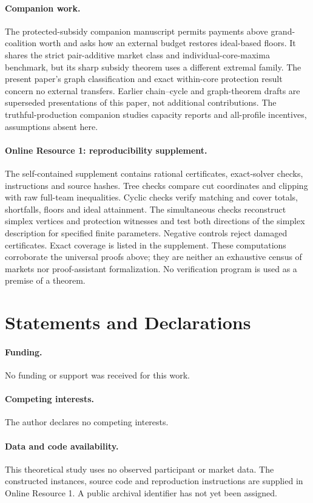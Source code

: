 \documentclass[11pt]{article}
\theoremstyle{remark}\newtheorem{remark}[theorem]{Remark}
\begin{document}
\paragraph{Companion work.}
The protected-subsidy companion manuscript permits payments above grand-coalition
worth and asks how an external budget restores ideal-based floors. It shares
the strict pair-additive market class and individual-core-maxima benchmark,
but its sharp subsidy theorem uses a different extremal family. The present
paper's graph classification and exact within-core protection result concern
no external transfers. Earlier
chain--cycle and graph-theorem drafts are superseded presentations of this
paper, not additional contributions. The truthful-production companion studies
capacity reports and all-profile incentives, assumptions absent here.

\paragraph{Online Resource 1: reproducibility supplement.}
The self-contained supplement contains rational certificates, exact-solver
checks, instructions and source hashes. Tree checks compare cut coordinates
and clipping with raw full-team inequalities. Cyclic checks verify matching
and cover totals, shortfalls, floors and ideal attainment. The simultaneous
checks reconstruct simplex vertices and protection witnesses and test both
directions of the simplex description for specified finite parameters.
Negative controls reject damaged certificates. Exact coverage is listed in
the supplement. These computations corroborate the universal proofs above;
they are neither an exhaustive census of markets nor proof-assistant
formalization. No verification program is used as a premise of a theorem.

\section*{Statements and Declarations}
\paragraph{Funding.} No funding or support was received for this work.
\paragraph{Competing interests.} The author declares no competing interests.
\paragraph{Data and code availability.}
This theoretical study uses no observed participant or market data. The
constructed instances, source code and reproduction instructions are supplied
in Online Resource 1. A public archival identifier has not yet been assigned.
\end{document}
